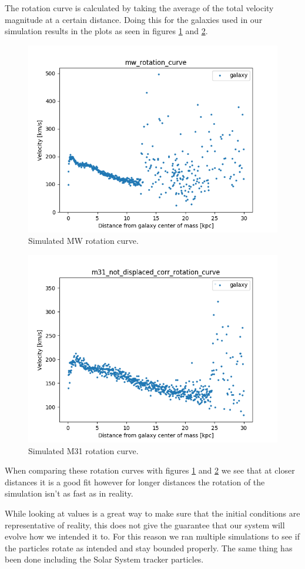 \documentclass[a4paper,12pt, english]{article}
\begin{document}
The rotation curve is calculated by taking the average of the total velocity magnitude at a certain distance. Doing this for the galaxies used in our simulation results in the plots as seen in figures \ref{fig:mw-rot-curve} and \ref{fig:m31-rot-curve}.\par

\begin{figure}[!h]
    \centering
    \includegraphics[width=0.6\linewidth]{VelocityDistr/mw_rotation_curve.png}
    \caption{Simulated MW rotation curve.}
    \label{fig:mw-rot-curve}
\end{figure}

\begin{figure}[!h]
    \centering
    \includegraphics[width=0.6\linewidth]{VelocityDistr/m31_not_displaced_corr_rotation_curve.png}
    \caption{Simulated M31 rotation curve.}
    \label{fig:m31-rot-curve}
\end{figure}\par
\smallskip
When comparing these rotation curves with figures \ref{fig:mw-rot-curve} and \ref{fig:m31-rot-curve} we see that at closer distances it is a good fit however for longer distances the rotation of the simulation isn't as fast as in reality.\par
\smallskip
While looking at values is a great way to make sure that the initial conditions are representative of reality, this does not give the guarantee that our system will evolve how we intended it to. For this reason we ran multiple simulations to see if the particles rotate as intended and stay bounded properly. The same thing has been done including the Solar System tracker particles.\par
\end{document}
